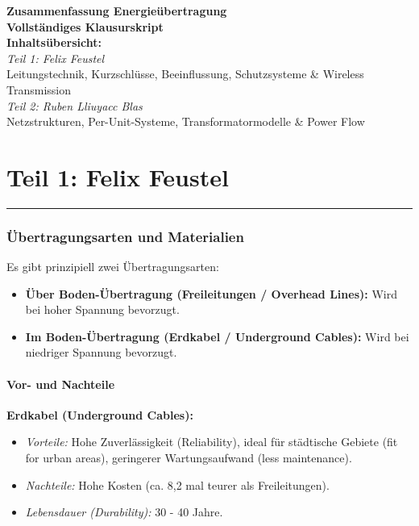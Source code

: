 \documentclass[11pt, a4paper]{article}
\begin{document}
\begin{titlepage}
    \centering
    \vspace*{4cm}
    {\Huge \textbf{Zusammenfassung Energieübertragung}}\\[1cm]
    {\LARGE \textbf{Vollständiges Klausurskript}}\\[2cm]
    {\large \textbf{Inhaltsübersicht:}}\\[0.5cm]
    \textit{Teil 1: Felix Feustel} \\
    Leitungstechnik, Kurzschlüsse, Beeinflussung, Schutzsysteme \& Wireless Transmission\\[0.5cm]
    \textit{Teil 2: Ruben Lliuyacc Blas} \\
    Netzstrukturen, Per-Unit-Systeme, Transformatormodelle \& Power Flow
    \vfill
\end{titlepage}

\tableofcontents
\newpage

\part*{Teil 1: Felix Feustel}
\hrule
\vspace{1cm}

\section{Übertragungsarten und Materialien}

Es gibt prinzipiell zwei Übertragungsarten:
\begin{itemize}
    \item \textbf{Über Boden-Übertragung (Freileitungen / Overhead Lines):} Wird bei hoher Spannung bevorzugt.
    \item \textbf{Im Boden-Übertragung (Erdkabel / Underground Cables):} Wird bei niedriger Spannung bevorzugt.
\end{itemize}

\subsection{Vor- und Nachteile}
\textbf{Erdkabel (Underground Cables):}
\begin{itemize}
    \item \textit{Vorteile:} Hohe Zuverlässigkeit (Reliability), ideal für städtische Gebiete (fit for urban areas), geringerer Wartungsaufwand (less maintenance).
    \item \textit{Nachteile:} Hohe Kosten (ca. 8,2 mal teurer als Freileitungen).
    \item \textit{Lebensdauer (Durability):} 30 - 40 Jahre.
\end{itemize}
\end{document}
